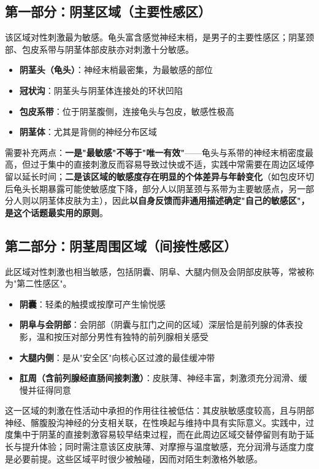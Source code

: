 \documentclass[12pt,a4paper,twoside]{ctexbook}
\begin{document}
\subsection{第一部分：阴茎区域（主要性感区）}

该区域对性刺激最为敏感。龟头富含感觉神经末梢，是男子的主要性感区；阴茎颈部、包皮系带与阴茎体部皮肤亦对刺激十分敏感。

\begin{itemize}
    \item \textbf{阴茎头（龟头）}：神经末梢最密集，为最敏感的部位
    \item \textbf{冠状沟}：阴茎头与阴茎体连接处的环状凹陷
    \item \textbf{包皮系带}：位于阴茎腹侧，连接龟头与包皮，敏感性极高
    \item \textbf{阴茎体}：尤其是背侧的神经分布区域
\end{itemize}

需要补充两点：\textbf{一是"最敏感"不等于"唯一有效"}——龟头与系带的神经末梢密度最高，但过于集中的直接刺激反而容易导致过快或不适，实践中常需要在周边区域停留以延长时间；\textbf{二是该区域的敏感度存在明显的个体差异与年龄变化}（如包皮环切后龟头长期暴露可能使敏感度下降，部分人以阴茎颈与系带为主要敏感点，另一部分人则以阴茎体皮肤为主），因此\textbf{以自身反馈而非通用描述确定"自己的敏感区"，是这个话题最实用的原则}。

\subsection{第二部分：阴茎周围区域（间接性感区）}

此区域对性刺激也相当敏感，包括阴囊、阴阜、大腿内侧及会阴部皮肤等，常被称为"第二性感区"。

\begin{itemize}
    \item \textbf{阴囊}：轻柔的触摸或按摩可产生愉悦感
    \item \textbf{阴阜与会阴部}：会阴部（阴囊与肛门之间的区域）深层恰是前列腺的体表投影，温和按压对部分男性有独特的前列腺相关感受
    \item \textbf{大腿内侧}：是从"安全区"向核心区过渡的最佳缓冲带
    \item \textbf{肛周（含前列腺经直肠间接刺激）}：皮肤薄、神经丰富，刺激须充分润滑、缓慢并征得同意
\end{itemize}

这一区域的刺激在性活动中承担的作用往往被低估：其皮肤敏感度较高，且与阴部神经、髂腹股沟神经的分支相关联，在性唤起与维持中具有实际意义。实践中，过度集中于阴茎的直接刺激容易较早结束过程，而在此周边区域交替停留则有助于延长与提升体验；同时需注意该区皮肤薄、对摩擦与温度敏感，充分润滑与适度力度是必要前提。这些区域平时很少被触碰，因而对陌生刺激格外敏感。
\end{document}

